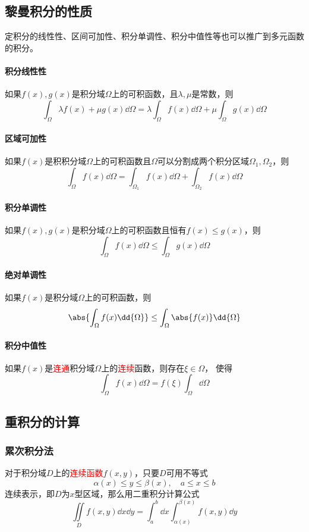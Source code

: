 \subsection{黎曼积分的性质}
定积分的线性性、区间可加性、积分单调性、积分中值性等也可以推广到多元函数的积分。
\paragraph{积分线性性}
如果$f(x),g(x)$是积分域$\Omega$上的可积函数，且$\lambda,\mu$是常数，则
\[ \int_\Omega \lambda f(x) + \mu g(x)\dd{\Omega} = \lambda\int_\Omega f(x)\dd{\Omega} + \mu\int_\Omega g(x)\dd{\Omega} \]

\paragraph{区域可加性}
如果$f(x)$是积积分域$\Omega$上的可积函数且$\Omega$可以分割成两个积分区域$\Omega_1,\Omega_2$，则
\[ \int_\Omega f(x)\dd{\Omega} = \int_{\Omega_1} f(x)\dd{\Omega} + \int_{\Omega_2} f(x)\dd{\Omega} \]

\paragraph{积分单调性}
如果$f(x),g(x)$是积分域$\Omega$上的可积函数且恒有$f(x)\leq g(x)$，则
\[ \int_\Omega f(x)\dd{\Omega} \leq \int_\Omega g(x)\dd{\Omega} \]

\paragraph{绝对单调性}
如果$f(x)$是积分域$\Omega$上的可积函数，则
\[ \abs{\int_\Omega f(x)\dd{\Omega}} \leq \int_\Omega \abs{f(x)}\dd{\Omega} \]

\paragraph{积分中值性}
如果$f(x)$是\textcolor{red}{连通}积分域$\Omega$上的\textcolor{red}{连续}函数，则存在$\xi\in\Omega$，
使得
\[ \int_\Omega f(x)\dd{\Omega} = f(\xi)\int_\Omega \dd\Omega \]

\subsection{重积分的计算}
\subsubsection{累次积分法}
对于积分域$D$上的\textcolor{red}{连续函数}$f(x,y)$，只要$D$可用不等式
\[ \alpha(x)\leq y \leq \beta(x),\quad a\leq x \leq b \]
连续表示，即$D$为$x$型区域，那么用二重积分计算公式
\begin{equation}
    \iint\limits_D f(x,y)\dd{x}\dd{y} =\int_a^b \dd{x}\int_{\alpha(x)}^{\beta(x)} f(x,y)\dd{y}
\end{equation}

